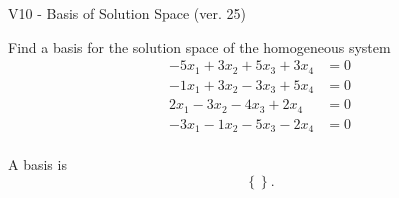\begin{exercise}
  \begin{exerciseTitle}V10 - Basis of Solution Space (ver. 25)\end{exerciseTitle}
  \begin{exerciseStatement}
    Find a basis for the solution space of the homogeneous system 
\begin{align*}
 -5 x_ 1 + 3 x_ 2 + 5 x_ 3 + 3 x_ 4 &= 0  \\ 
  -1 x_ 1 + 3 x_ 2 -3 x_ 3 + 5 x_ 4 &= 0  \\ 
  2 x_ 1 -3 x_ 2 -4 x_ 3 + 2 x_ 4 &= 0  \\ 
  -3 x_ 1 -1 x_ 2 -5 x_ 3 -2 x_ 4 &= 0  \\ 
 \end{align*}


 
  \end{exerciseStatement}

  \begin{exerciseAnswer}
   A basis is   
\[\left\{\right\}.\]

  


  \end{exerciseAnswer}
\end{exercise}